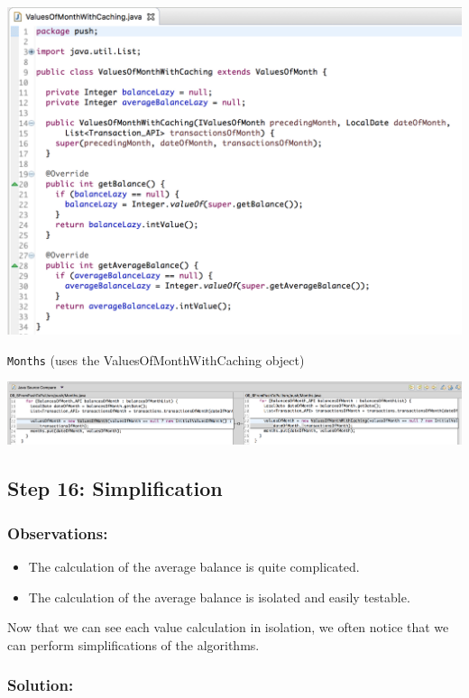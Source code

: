 \documentclass[a4paper,fleqn,titlepage,11pt]{article}
\begin{document}
\includegraphics[width=1\textwidth]{CompareViews/15-1.png}

\texttt{Months} (uses the ValuesOfMonthWithCaching object)

\includegraphics[width=1\textwidth]{CompareViews/14-15-2.png}


\subsection*{Step 16: Simplification}

\subsubsection*{Observations:}
\begin{itemize}
\item The calculation of the average balance is quite complicated.
\item The calculation of the average balance is isolated and easily testable.
\end{itemize}

Now that we can see each value calculation in isolation, we often notice that we can perform simplifications of the algorithms. 

\subsubsection*{Solution:}
\end{document}

